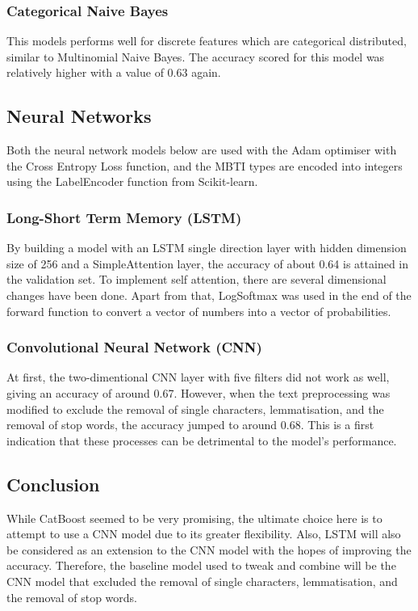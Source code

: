 \documentclass[11pt,a4paper]{article}
\begin{document}
	\subsubsection{Categorical Naive Bayes}
	This models performs well for discrete features which are categorical distributed, similar to Multinomial Naive Bayes. The accuracy scored for this model was relatively higher with a value of 0.63 again.
	
	
	\subsection{Neural Networks}
	
	Both the neural network models below are used with the Adam optimiser with the Cross Entropy Loss function, and the MBTI types are encoded into integers using the LabelEncoder function from Scikit-learn.
	
	\subsubsection{Long-Short Term Memory (LSTM)}
	
	By building a model with an LSTM single direction layer with hidden dimension size of 256 and a SimpleAttention layer, the accuracy of about 0.64 is attained in the validation set. To implement self attention, there are several dimensional changes have been done. Apart from that, LogSoftmax was used in the end of the forward function to convert a vector of numbers into a vector of probabilities. 
	
	\subsubsection{Convolutional Neural Network (CNN)}
	
	At first, the two-dimentional CNN layer with five filters did not work as well, giving an accuracy of around 0.67. However, when the text preprocessing was modified to exclude the removal of single characters, lemmatisation, and the removal of stop words, the accuracy jumped to around 0.68. This is a first indication that these processes can be detrimental to the model's performance.
	
	\subsection{Conclusion}
	
	While CatBoost seemed to be very promising, the ultimate choice here is to attempt to use a CNN model due to its greater flexibility. Also, LSTM will also be considered as an extension to the CNN model with the hopes of improving the accuracy. Therefore, the baseline model used to tweak and combine will be the CNN model that excluded the removal of single characters, lemmatisation, and the removal of stop words.
	
\end{document}

